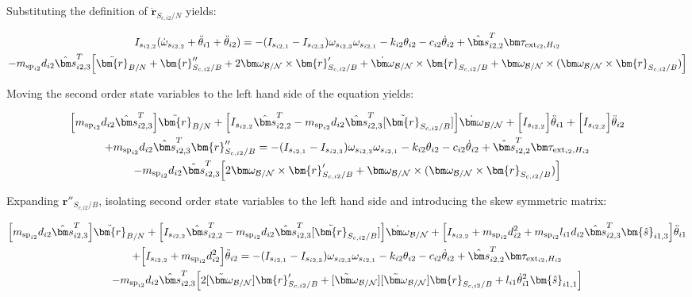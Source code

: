 Substituting the definition of $\ddot{\bm r}_{S_{c,i2}/N}$ yields:

\begin{multline}
	I_{s_{i2,2}} ( \dot\omega_{s_{i2,2}} + \ddot\theta_{i1} + \ddot\theta_{i2}) = - (I_{s_{i2,1}} - I_{s_{i2,3}}) \omega_{s_{i2,3}} \omega_{s_{i2,1}} - k_{i2} \theta_{i2} - c_{i2} \dot{\theta}_{i2} + \hat{\bm s}_{i2,2}^T \bm \tau_{\text{ext}_{i2},H_{i2}}  \\
	-  m_{\text{sp}_{i2}} d_{i2} \hat{\bm s}_{i2,3}^T \Big[ \ddot{\bm{r}}_{B/N} + \bm{r}''_{S_{c,i2}/B} + 2 \bm\omega_{\cal B/N} \times \bm{r}'_{S_{c,i2}/B} +  \dot{\bm\omega}_{\cal B/N} \times \bm{r}_{S_{c,i2}/B} + \bm\omega_{\cal B/N} \times (\bm\omega_{\cal B/N} \times \bm{r}_{S_{c,i2}/B})\Big]
\end{multline}

Moving the second order state variables to the left hand side of the equation yields:

\begin{multline}
	\Big[m_{\text{sp}_{i2}} d_{i2} \hat{\bm s}_{i2,3}^T\Big] \ddot{\bm{r}}_{B/N} + \Big[I_{s_{i2,2}} \hat{\bm s}_{i2,2}^T - m_{\text{sp}_{i2}} d_{i2} \hat{\bm s}_{i2,3}^T [\tilde{\bm{r}}_{S_{c,i2}/B}]\Big] \dot{\bm\omega}_{\cal B/N} + \Big[I_{s_{i2,2}}\Big] \ddot\theta_{i1} + \Big[I_{s_{i2,2}}\Big] \ddot\theta_{i2} \\
	+ m_{\text{sp}_{i2}} d_{i2} \hat{\bm s}_{i2,3}^T  \bm{r}''_{S_{c,i2}/B} = - (I_{s_{i2,1}} - I_{s_{i2,3}}) \omega_{s_{i2,3}} \omega_{s_{i2,1}} - k_{i2} \theta_{i2} - c_{i2} \dot{\theta}_{i2} + \hat{\bm s}_{i2,2}^T \bm \tau_{\text{ext}_{i2},H_{i2}}  \\
	-  m_{\text{sp}_{i2}} d_{i2} \hat{\bm s}_{i2,3}^T \Big[ 2 \bm\omega_{\cal B/N} \times \bm{r}'_{S_{c,i2}/B} + \bm\omega_{\cal B/N} \times (\bm\omega_{\cal B/N} \times \bm{r}_{S_{c,i2}/B})\Big]
\end{multline}

Expanding $\bm{r}''_{S_{c,i2}/B}$, isolating second order state variables to the left hand side and introducing the skew symmetric matrix:

\begin{multline}
	\Big[m_{\text{sp}_{i2}} d_{i2} \hat{\bm s}_{i2,3}^T\Big] \ddot{\bm{r}}_{B/N} + \Big[I_{s_{i2,2}} \hat{\bm s}_{i2,2}^T - m_{\text{sp}_{i2}} d_{i2} \hat{\bm s}_{i2,3}^T [\tilde{\bm{r}}_{S_{c,i2}/B}]\Big] \dot{\bm\omega}_{\cal B/N} + \Big[I_{s_{i2,2}} + m_{\text{sp}_{i2}} d_{i2}^2 + m_{\text{sp}_{i2}} l_{i1} d_{i2} \hat{\bm s}_{i2,3}^T \bm{\hat{s}}_{i1,3} \Big] \ddot\theta_{i1} \\
	+ \Big[I_{s_{i2,2}} + m_{\text{sp}_{i2}} d_{i2}^2 \Big] \ddot\theta_{i2}
	= - (I_{s_{i2,1}} - I_{s_{i2,3}}) \omega_{s_{i2,3}} \omega_{s_{i2,1}} - k_{i2} \theta_{i2} - c_{i2} \dot{\theta}_{i2} + \hat{\bm s}_{i2,2}^T \bm \tau_{\text{ext}_{i2},H_{i2}}  \\
	-  m_{\text{sp}_{i2}} d_{i2} \hat{\bm s}_{i2,3}^T \Big[ 2 [\tilde{\bm\omega}_{\cal B/N}] \bm{r}'_{S_{c,i2}/B} + [\tilde{\bm\omega}_{\cal B/N}] [\tilde{\bm\omega}_{\cal B/N}] \bm{r}_{S_{c,i2}/B} + l_{i1} \dot{\theta}_{i1}^2 \bm{\hat{s}}_{i1,1} \Big]
	\label{eq:sp2final}
\end{multline}

